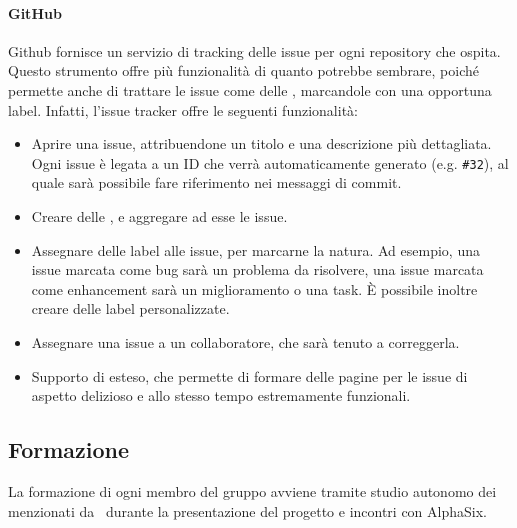     		\paragraph{GitHub}\label{Github}
			Github fornisce un servizio di tracking delle issue per ogni repository che ospita. Questo strumento offre più funzionalità di quanto potrebbe
			sembrare, poich\'e permette anche di trattare le issue come delle , marcandole con una opportuna label. Infatti, l'issue tracker offre le seguenti
			funzionalità:
			\begin{itemize}
				\item Aprire una issue, attribuendone un titolo e una descrizione più dettagliata. Ogni issue è legata a un ID che verrà automaticamente generato (e.g. \texttt{\#32}), 
					al quale sarà possibile fare riferimento nei messaggi di commit.
				\item Creare delle , e aggregare ad esse le issue.
				\item Assegnare delle label alle issue, per marcarne la natura. Ad esempio, una issue marcata come bug sarà un problema da risolvere,
					una issue marcata come enhancement sarà un miglioramento o una task. È possibile inoltre creare delle label personalizzate.
				\item Assegnare una issue a un collaboratore, che sarà tenuto a correggerla.
				\item Supporto di  esteso, che permette di formare delle pagine per le issue di aspetto delizioso e allo stesso tempo estremamente funzionali.
			\end{itemize}




	\subsection{Formazione}

		La formazione di ogni membro del gruppo avviene tramite studio autonomo dei  menzionati da \II\ durante la presentazione del progetto e incontri con AlphaSix.


